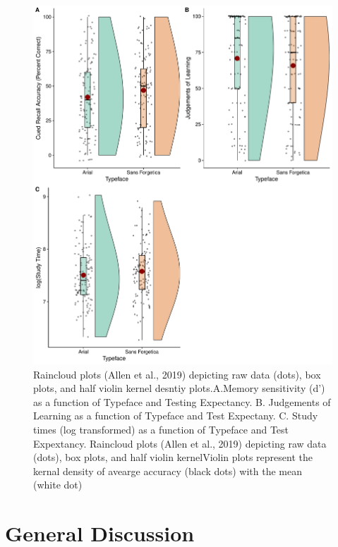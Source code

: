 \documentclass[
  english,
  jou]{apa6}
\begin{document}
\begin{figure}

{\centering \includegraphics{Testing_Expectancy_SF_files/figure-latex/unnamed-chunk-20-1} 

}

\caption{Raincloud plots (Allen et al., 2019) depicting raw data (dots), box plots, and half violin kernel desntiy plots.A.Memory sensitivity (d') as a function of Typeface and Testing Expectancy. B. Judgements of Learning as a function of Typeface and Test Expectany. C. Study times (log transformed) as a function of Typeface and Test Expextancy. Raincloud plots (Allen et al., 2019) depicting raw data (dots), box plots, and half violin kernelViolin plots represent the kernal density of avearge accuracy (black dots) with the mean (white dot)}\label{fig:unnamed-chunk-20}
\end{figure}

\hypertarget{general-discussion}{%
\section{General Discussion}\label{general-discussion}}
\end{document}
